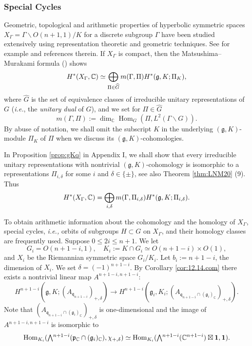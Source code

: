 \subsubsection{Special Cycles}
Geometric, topological and arithmetic properties of hyperbolic symmetric spaces $X_\Gamma=\Gamma\backslash O(n+1,1)/K$ for a discrete subgroup $\Gamma $ have been studied extensively using representation theoretic and geometric techniques. 
See for example \cite{BC, BMM} and references therein. 
If $X_\Gamma$ is compact, 
 then the Matsushima--Murakami formula 
 (\cite[Chap.~VII, Thm.~3.2]{BW})
shows
\[
   H^{\ast}(X_\Gamma, {\mathbb C}) 
 \simeq \bigoplus_{\Pi \in \widehat{G}}  m(\Gamma, {\Pi})
   H^{\ast}({\mathfrak g},K; \Pi_K), 
\]
where
 $\widehat G$ is the set of equivalence classes 
 of irreducible unitary representations of $G$ 
({\it{i.e.}}, the {\it{unitary dual}} of $G$), 
 and we set for $\Pi \in \widehat G$
\[ 
  m(\Gamma,\Pi) := \dim_{\mathbb{C}} {\operatorname{Hom}}_G (\Pi,L^2(\Gamma\backslash G)). 
\]
By abuse of notation,
 we shall omit the subscript $K$ in the underlying $({\mathfrak g},K)$-module
 $\Pi_K$ of $\Pi$
 when we discuss its $({\mathfrak g},K)$-cohomologies.  



In Proposition \ref{prop:gKq} in Appendix I,
 we shall show that every irreducible unitary representations with nontrivial $(\mathfrak{g},K)$-cohomology is isomorphic to a representations ${\Pi}_{i,\delta}$
 for some $i$ and $\delta \in \{\pm\}$, 
 see also Theorem \ref{thm:LNM20} (9). 
Thus
\[
   H^{\ast}(X_\Gamma, {\mathbb C}) 
   = \bigoplus_{i,\delta} m(\Gamma, {\Pi}_{i,\delta})
   H^{\ast}({\mathfrak{g}},K; {\Pi}_{i,\delta}).  
\]



To obtain arithmetic information about the cohomology and the homology of $X_\Gamma $,
special cycles, 
{\it{i.e.,}} orbits of subgroups $H \subset G$ on $X_\Gamma$, 
 and their homology classes are frequently used. 
Suppose $0 \le 2i \le n+1$.  
We let 
\[
 G_i=O(n+1-i,1), 
\quad
 K_i :=K \cap G_i \simeq O(n+1-i) \times O(1), 
\]
 and $X_i$ be the Riemannian symmetric space $G_i/K_i$. 
Let $b_i :=n+1-i$, 
 the dimension of $X_i$.  
We set $\delta= (-1)^{n+1-i}$.  
By Corollary \ref{cor:12.14.com}  there  exists a nontrivial linear map  
$A^{n+1-i,n+1-i}:$
\[  
    H^{n+1-i}({\mathfrak{g}}, K; (A_{{\mathfrak{q}_{n+1-i}}})_{+,\delta})
  \to  
   H^{n+1-i}({\mathfrak{g}}_i, K_i; (A_{{\mathfrak{q}_{n+1-i}} \cap (\mathfrak{g}_i)_{\mathbb{C}}})_{+,\delta}). 
\]
Note that 
$(A_{{\mathfrak{q}}_{n+1-i} \cap ({\mathfrak{g}}_i)_{\mathbb{C}}})_{+,\delta}$ is one-dimensional
 and the image of $A^{n+1-i,n+1-i}$ is isomorphic to
\[
 {\operatorname{Hom}}_{K_i}
 (\Exterior^{n+1-i}({\mathfrak{p}}_{\mathbb{C}}\cap({\mathfrak{g}}_i)_{\mathbb{C}}),\chi_{+,\delta})
 \simeq  
 {\operatorname{Hom}}_{K_i}
 (\Exterior^{n+1-i}({{\mathbb C}^{n+1-i})\boxtimes {\bf{1}},
 {\mathbf 1}}). \]



